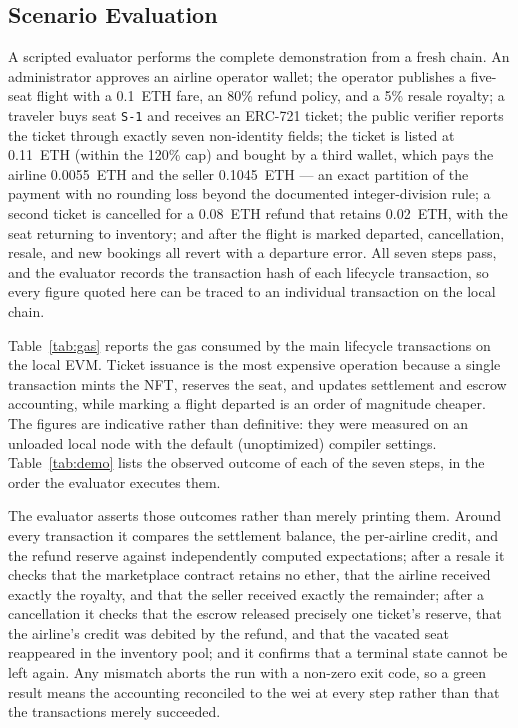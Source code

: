 \documentclass[conference]{IEEEtran}
\begin{document}
\subsection{Scenario Evaluation}
A scripted evaluator performs the complete demonstration from a fresh chain. An administrator approves an airline operator wallet; the operator publishes a five-seat flight with a 0.1~ETH fare, an 80\% refund policy, and a 5\% resale royalty; a traveler buys seat \texttt{S-1} and receives an ERC-721 ticket; the public verifier reports the ticket through exactly seven non-identity fields; the ticket is listed at 0.11~ETH (within the 120\% cap) and bought by a third wallet, which pays the airline 0.0055~ETH and the seller 0.1045~ETH --- an exact partition of the payment with no rounding loss beyond the documented integer-division rule; a second ticket is cancelled for a 0.08~ETH refund that retains 0.02~ETH, with the seat returning to inventory; and after the flight is marked departed, cancellation, resale, and new bookings all revert with a departure error. All seven steps pass, and the evaluator records the transaction hash of each lifecycle transaction, so every figure quoted here can be traced to an individual transaction on the local chain.

Table~\ref{tab:gas} reports the gas consumed by the main lifecycle transactions on the local EVM. Ticket issuance is the most expensive operation because a single transaction mints the NFT, reserves the seat, and updates settlement and escrow accounting, while marking a flight departed is an order of magnitude cheaper. The figures are indicative rather than definitive: they were measured on an unloaded local node with the default (unoptimized) compiler settings. Table~\ref{tab:demo} lists the observed outcome of each of the seven steps, in the order the evaluator executes them.

The evaluator asserts those outcomes rather than merely printing them. Around every transaction it compares the settlement balance, the per-airline credit, and the refund reserve against independently computed expectations; after a resale it checks that the marketplace contract retains no ether, that the airline received exactly the royalty, and that the seller received exactly the remainder; after a cancellation it checks that the escrow released precisely one ticket's reserve, that the airline's credit was debited by the refund, and that the vacated seat reappeared in the inventory pool; and it confirms that a terminal state cannot be left again. Any mismatch aborts the run with a non-zero exit code, so a green result means the accounting reconciled to the wei at every step rather than that the transactions merely succeeded.
\end{document}
